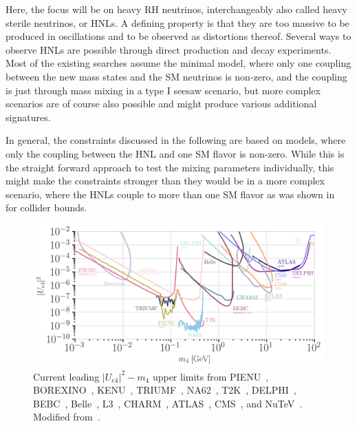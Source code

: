 Here, the focus will be on heavy RH neutrinos, interchangeably also called heavy sterile neutrinos, or HNLs. A defining property is that they are too massive to be produced in oscillations and to be observed as distortions thereof. Several ways to observe HNLs are possible through direct production and decay experiments. Most of the existing searches assume the minimal model, where only one coupling between the new mass states and the SM neutrinos is non-zero, and the coupling is just through mass mixing in a type I seesaw scenario, but more complex scenarios are of course also possible and might produce various additional signatures.

In general, the constraints discussed in the following are based on models, where only the coupling between the HNL and one SM flavor is non-zero. While this is the straight forward approach to test the mixing parameters individually, this might make the constraints stronger than they would be in a more complex scenario, where the HNLs couple to more than one SM flavor as was shown in~ for collider bounds.

\begin{figure}[h]
    \includegraphics{figures/hnl_simulation/theory/UeN_majorana.png}
    \caption[Current leading $|U_{e4}|^2-m_4$ upper limits]{Current leading $|U_{e4}|^2-m_4$ upper limits from PIENU~\cite{pienu_Bryman:2019bjg, PIENU:2017wbj}, BOREXINO~\cite{Borexino:2013bot}, KENU~\cite{pienu_Bryman:2019bjg}, TRIUMF~\cite{triumf_ue4_Britton1992ImprovedSF}, NA62~\cite{NA62:2022pyf}, T2K~\cite{T2K:2019jwa}, DELPHI~\cite{DELPHI:1996qcc}, BEBC~\cite{Barouki:2022bkt}, Belle~\cite{Belle:2013ytx}, L3~\cite{L3:2001zfe}, CHARM~\cite{CHARM:1983ayi}, ATLAS~\cite{ATLAS:2019kpx, atlas_2022_HNL_PhysRevLett.131.061803}, CMS~\cite{CMS:2018iaf, CMS:2022fut}, and NuTeV~\cite{NuTeV:1999kej}. Modified from~\cite{hoster_limitFernandez-Martinez:2023phj}.}
\end{figure}


